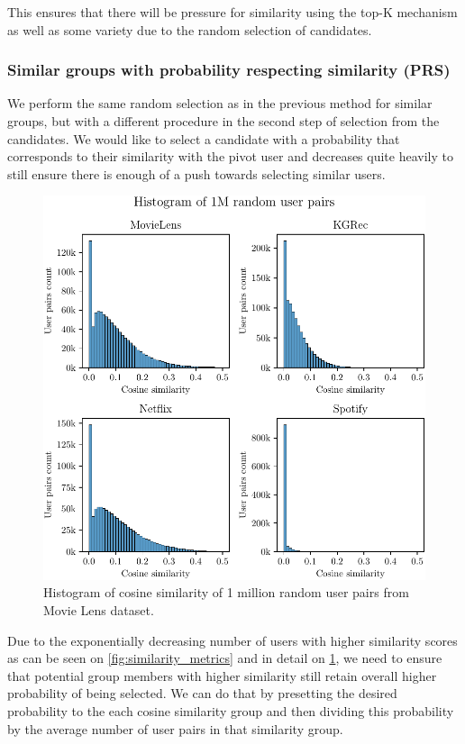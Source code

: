 This ensures that there will be pressure for similarity using the top-K mechanism as well as some variety due to the random selection of candidates.

\subsubsection{Similar groups with probability respecting similarity (PRS)}
We perform the same random selection as in the previous method for similar groups, but with a different procedure in the second step of selection from the candidates. We would like to select a candidate with a probability that corresponds to their similarity with the pivot user and decreases quite heavily to still ensure there is enough of a push towards selecting similar users.

\begin{figure}[ht!]
    \centering
    \includegraphics{img/figures/histogram_cosine_all.pdf}
    \caption{Histogram of cosine similarity of 1 million random user pairs from Movie Lens dataset.}
    \label{fig:cosine_movielens_histogram}
\end{figure}

Due to the exponentially decreasing number of users with higher similarity scores as can be seen on \ref{fig:similarity_metrics} and in detail on \ref{fig:cosine_movielens_histogram}, we need to ensure that potential group members with higher similarity still retain overall higher probability of being selected. We can do that by presetting the desired probability to the each cosine similarity group and then dividing this probability by the average number of user pairs in that similarity group.

